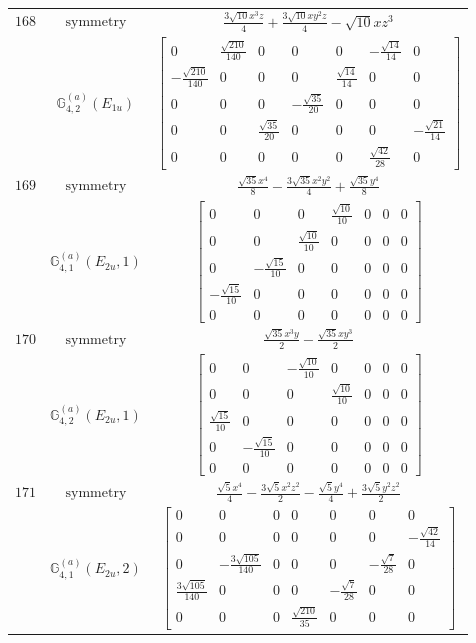 \documentclass[fleqn,8pt,landscape]{jsarticle}
\begin{document}
\begin{longtable}{ccc}
$ 168 $ & $ \text{symmetry} $ & $ \frac{3 \sqrt{10} x^{3} z}{4} + \frac{3 \sqrt{10} x y^{2} z}{4} - \sqrt{10} x z^{3} $ \\
$  $ & $ \mathbb{G}_{4,2}^{(a)}(E_{1u}) $ & $ \begin{bmatrix} 0 & \frac{\sqrt{210}}{140} & 0 & 0 & 0 & - \frac{\sqrt{14}}{14} & 0 \\ - \frac{\sqrt{210}}{140} & 0 & 0 & 0 & \frac{\sqrt{14}}{14} & 0 & 0 \\ 0 & 0 & 0 & - \frac{\sqrt{35}}{20} & 0 & 0 & 0 \\ 0 & 0 & \frac{\sqrt{35}}{20} & 0 & 0 & 0 & - \frac{\sqrt{21}}{14} \\ 0 & 0 & 0 & 0 & 0 & \frac{\sqrt{42}}{28} & 0 \end{bmatrix} $ \\ \hline
$ 169 $ & $ \text{symmetry} $ & $ \frac{\sqrt{35} x^{4}}{8} - \frac{3 \sqrt{35} x^{2} y^{2}}{4} + \frac{\sqrt{35} y^{4}}{8} $ \\
$  $ & $ \mathbb{G}_{4,1}^{(a)}(E_{2u},1) $ & $ \begin{bmatrix} 0 & 0 & 0 & \frac{\sqrt{10}}{10} & 0 & 0 & 0 \\ 0 & 0 & \frac{\sqrt{10}}{10} & 0 & 0 & 0 & 0 \\ 0 & - \frac{\sqrt{15}}{10} & 0 & 0 & 0 & 0 & 0 \\ - \frac{\sqrt{15}}{10} & 0 & 0 & 0 & 0 & 0 & 0 \\ 0 & 0 & 0 & 0 & 0 & 0 & 0 \end{bmatrix} $ \\ \hline
$ 170 $ & $ \text{symmetry} $ & $ \frac{\sqrt{35} x^{3} y}{2} - \frac{\sqrt{35} x y^{3}}{2} $ \\
$  $ & $ \mathbb{G}_{4,2}^{(a)}(E_{2u},1) $ & $ \begin{bmatrix} 0 & 0 & - \frac{\sqrt{10}}{10} & 0 & 0 & 0 & 0 \\ 0 & 0 & 0 & \frac{\sqrt{10}}{10} & 0 & 0 & 0 \\ \frac{\sqrt{15}}{10} & 0 & 0 & 0 & 0 & 0 & 0 \\ 0 & - \frac{\sqrt{15}}{10} & 0 & 0 & 0 & 0 & 0 \\ 0 & 0 & 0 & 0 & 0 & 0 & 0 \end{bmatrix} $ \\ \hline
$ 171 $ & $ \text{symmetry} $ & $ \frac{\sqrt{5} x^{4}}{4} - \frac{3 \sqrt{5} x^{2} z^{2}}{2} - \frac{\sqrt{5} y^{4}}{4} + \frac{3 \sqrt{5} y^{2} z^{2}}{2} $ \\
$  $ & $ \mathbb{G}_{4,1}^{(a)}(E_{2u},2) $ & $ \begin{bmatrix} 0 & 0 & 0 & 0 & 0 & 0 & 0 \\ 0 & 0 & 0 & 0 & 0 & 0 & - \frac{\sqrt{42}}{14} \\ 0 & - \frac{3 \sqrt{105}}{140} & 0 & 0 & 0 & - \frac{\sqrt{7}}{28} & 0 \\ \frac{3 \sqrt{105}}{140} & 0 & 0 & 0 & - \frac{\sqrt{7}}{28} & 0 & 0 \\ 0 & 0 & 0 & \frac{\sqrt{210}}{35} & 0 & 0 & 0 \end{bmatrix} $ \\ \hline

\end{longtable}
\end{document}
